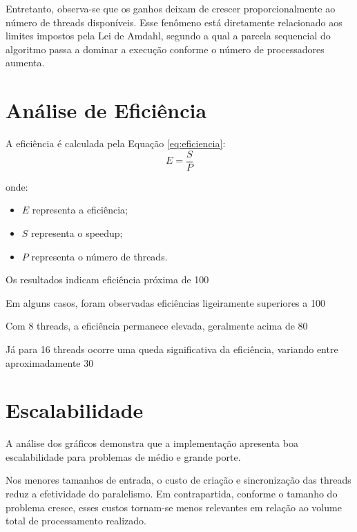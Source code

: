 \documentclass[
12pt,
oneside,
a4paper,
brazil
]{abntex2}
\begin{document}
Entretanto, observa-se que os ganhos deixam de crescer proporcionalmente ao número de threads disponíveis. Esse fenômeno está diretamente relacionado aos limites impostos pela Lei de Amdahl, segundo a qual a parcela sequencial do algoritmo passa a dominar a execução conforme o número de processadores aumenta.

\section{Análise de Eficiência}

A eficiência é calculada pela Equação \ref{eq:eficiencia}:
\begin{equation}
	E = \frac{S}{P}
	\label{eq:eficiencia}
\end{equation}

onde:
\begin{itemize}
	\item $E$ representa a eficiência;
	\item $S$ representa o speedup;
	\item $P$ representa o número de threads.
\end{itemize}

Os resultados indicam eficiência próxima de 100%

Em alguns casos, foram observadas eficiências ligeiramente superiores a 100%

Com 8 threads, a eficiência permanece elevada, geralmente acima de 80%

Já para 16 threads ocorre uma queda significativa da eficiência, variando entre aproximadamente 30%

\section{Escalabilidade}

A análise dos gráficos demonstra que a implementação apresenta boa escalabilidade para problemas de médio e grande porte.

Nos menores tamanhos de entrada, o custo de criação e sincronização das threads reduz a efetividade do paralelismo. Em contrapartida, conforme o tamanho do problema cresce, esses custos tornam-se menos relevantes em relação ao volume total de processamento realizado.
\end{document}

